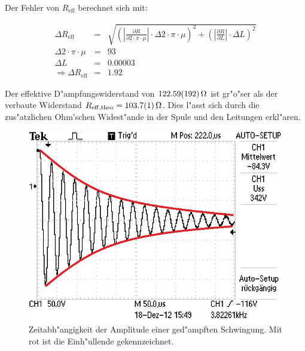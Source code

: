 	Der Fehler von $R_\mathrm{eff}$ berechnet sich mit:

	\begin{eqnarray*}
		\Delta R_\mathrm{eff} &=& \sqrt{ \left( |\frac{\partial R}{\partial 2 \cdot \pi \cdot \mu}| \cdot \Delta 2 \cdot \pi \cdot \mu \right)^2 + \left( |\frac{\partial R}{\partial L}| \cdot \Delta L \right)^2}\\ \label{fehler}
		\Delta 2 \cdot \pi \cdot \mu &=& 93\\
		\Delta L &=& 0.00003\\
		\Rightarrow \Delta R_\mathrm{eff} &=& 1.92
	\end{eqnarray*}

	Der effektive D"ampfungswiderstand von $\SI{122.59 (192)}{\ohm}$ ist gr"o"ser als der verbaute Widerstand $R_\mathrm{eff,theo} = \SI{103.7 (1)}{\ohm}$. Dies l"asst sich durch die zus"atzlichen Ohm'schen Widest"ande in der Spule und den Leitungen erkl"aren.

	\clearpage

	\begin{figure}[H]
		\centering
		\includegraphics[width = 12cm]{img/F0006TEK.jpg}
		\caption{Zeitabh"angigkeit der Amplitude einer ged"ampften Schwingung. Mit rot ist die Einh"ullende gekennzeichnet.}
		\label{amplitude}
	\end{figure}

